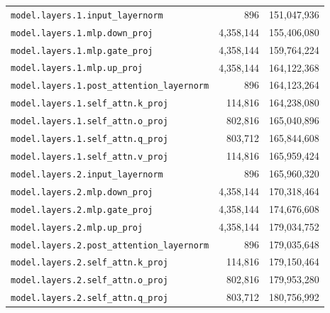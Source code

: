 \documentclass[10pt,a4paper]{article}
\theoremstyle{definition}
\begin{document}
\begin{appendices}
\begin{longtable}{p{9.5cm}rr}
\texttt{model.\allowbreak{}layers.\allowbreak{}1.\allowbreak{}input\_layernorm} & 896 & 151,047,936 \\
\texttt{model.\allowbreak{}layers.\allowbreak{}1.\allowbreak{}mlp.\allowbreak{}down\_proj} & 4,358,144 & 155,406,080 \\
\texttt{model.\allowbreak{}layers.\allowbreak{}1.\allowbreak{}mlp.\allowbreak{}gate\_proj} & 4,358,144 & 159,764,224 \\
\texttt{model.\allowbreak{}layers.\allowbreak{}1.\allowbreak{}mlp.\allowbreak{}up\_proj} & 4,358,144 & 164,122,368 \\
\texttt{model.\allowbreak{}layers.\allowbreak{}1.\allowbreak{}post\_attention\_layernorm} & 896 & 164,123,264 \\
\texttt{model.\allowbreak{}layers.\allowbreak{}1.\allowbreak{}self\_attn.\allowbreak{}k\_proj} & 114,816 & 164,238,080 \\
\texttt{model.\allowbreak{}layers.\allowbreak{}1.\allowbreak{}self\_attn.\allowbreak{}o\_proj} & 802,816 & 165,040,896 \\
\texttt{model.\allowbreak{}layers.\allowbreak{}1.\allowbreak{}self\_attn.\allowbreak{}q\_proj} & 803,712 & 165,844,608 \\
\texttt{model.\allowbreak{}layers.\allowbreak{}1.\allowbreak{}self\_attn.\allowbreak{}v\_proj} & 114,816 & 165,959,424 \\
\texttt{model.\allowbreak{}layers.\allowbreak{}2.\allowbreak{}input\_layernorm} & 896 & 165,960,320 \\
\texttt{model.\allowbreak{}layers.\allowbreak{}2.\allowbreak{}mlp.\allowbreak{}down\_proj} & 4,358,144 & 170,318,464 \\
\texttt{model.\allowbreak{}layers.\allowbreak{}2.\allowbreak{}mlp.\allowbreak{}gate\_proj} & 4,358,144 & 174,676,608 \\
\texttt{model.\allowbreak{}layers.\allowbreak{}2.\allowbreak{}mlp.\allowbreak{}up\_proj} & 4,358,144 & 179,034,752 \\
\texttt{model.\allowbreak{}layers.\allowbreak{}2.\allowbreak{}post\_attention\_layernorm} & 896 & 179,035,648 \\
\texttt{model.\allowbreak{}layers.\allowbreak{}2.\allowbreak{}self\_attn.\allowbreak{}k\_proj} & 114,816 & 179,150,464 \\
\texttt{model.\allowbreak{}layers.\allowbreak{}2.\allowbreak{}self\_attn.\allowbreak{}o\_proj} & 802,816 & 179,953,280 \\
\texttt{model.\allowbreak{}layers.\allowbreak{}2.\allowbreak{}self\_attn.\allowbreak{}q\_proj} & 803,712 & 180,756,992 \\

\end{longtable}
\end{appendices}
\end{document}
